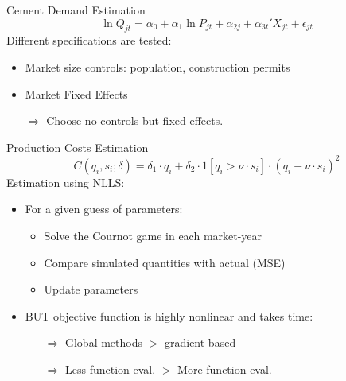 \documentclass[12pt]{beamer}
\begin{document}
\begin{frame}{Cement Demand Estimation}
$$\ln Q_{jt} = \alpha_0 + \alpha_1\ln P_{jt} + \alpha_{2j} + \alpha_{3t}'X_{jt} + \epsilon_{jt} $$
Different specifications are tested:\begin{itemize}
\item Market size controls: population, construction permits
\item Market Fixed Effects
\item[$\Rightarrow$] Choose no controls but fixed effects. 
\end{itemize}
\end{frame}

\begin{frame}{Production Costs Estimation}
$$C(q_i, s_i; \delta) = \delta_1 \cdot q_i + \delta_2 \cdot 1[q_i > \nu\cdot s_i] \cdot (q_i - \nu\cdot s_i)^2 $$
Estimation using NLLS:\begin{itemize}
\item For a given guess of parameters:
\begin{itemize}
\item Solve the Cournot game in each market-year
\item Compare simulated quantities with actual (MSE)
\item Update parameters
\item[]
\end{itemize}
\item BUT objective function is highly nonlinear and takes time:
\begin{itemize}
\item[$\Rightarrow$] Global methods $>$ gradient-based
\item[$\Rightarrow$] Less function eval. $>$ More function eval.
\end{itemize}
\end{itemize}
\end{frame}
\end{document}
